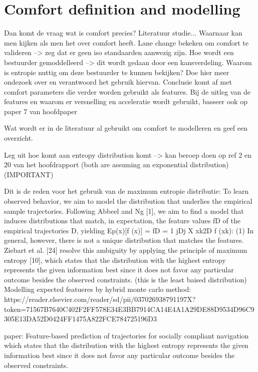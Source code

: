 \chapter{Comfort definition and modelling}
\label{cha:1}

Dan komt de vraag wat is comfort precies? Literatuur studie...
Waarnaar kan men kijken als men het over comfort heeft. 
Lane change bekeken om comfort te valideren --> zeg dat er geen iso standaarden aanwezig zijn.
Hoe wordt een bestuurder gemoddelleerd --> dit wordt gedaan door een kansverdeling.
Waarom is entropie nuttig om deze bestuurder te kunnen bekijken? Doe hier meer ondezoek over en verantwoord het gebruik hiervan. Conclusie komt af met comfort parameters die verder worden gebruikt als features.
Bij de uitleg van de features en waarom er versnelling en acceleratie wordt gebruikt, basseer ook op paper 7 van hoofdpaper

Wat wordt er in de literatuur al gebruikt om comfort te modelleren en geef een overzicht.

Leg uit hoe komt aan entropy distribution komt --> kan beroep doen op ref 2 en 20 van het hoofdrapport (both are assuming an exponential distribution) (IMPORTANT)


Dit is de reden voor het gebruik van de maximum entropie distributie: 
	To learn observed behavior, we aim to model the distribution
	that underlies the empirical sample trajectories.
	Following Abbeel and Ng [1], we aim to find a model that
	induces distributions that match, in expectation, the feature
	values fD of the empirical trajectories D, yielding
	Ep(x)[f (x)] = fD =
	1
	jDj
	X
	xk2D
	f (xk): (1)
	In general, however, there is not a unique distribution that
	matches the features. Ziebart et al. [24] resolve this ambiguity
	by applying the principle of maximum entropy [10], which
	states that the distribution with the highest entropy represents
	the given information best since it does not favor any
	particular outcome besides the observed constraints. (this is the least baised distribution)
	Modelling expected featueres by hybrid monte carlo method: https://reader.elsevier.com/reader/sd/pii/037026938791197X?token=71567B7640C402F2FF578E34E3BB7914CA14E4A1A29DE88D9534D96C9305E13DA52D0424FF1475A822FCE784725196D3

 	paper: Feature-based prediction of trajectories for socially compliant navigation
	which
	states that the distribution with the highest entropy represents
	the given information best since it does not favor any
	particular outcome besides the observed constraints.
	
